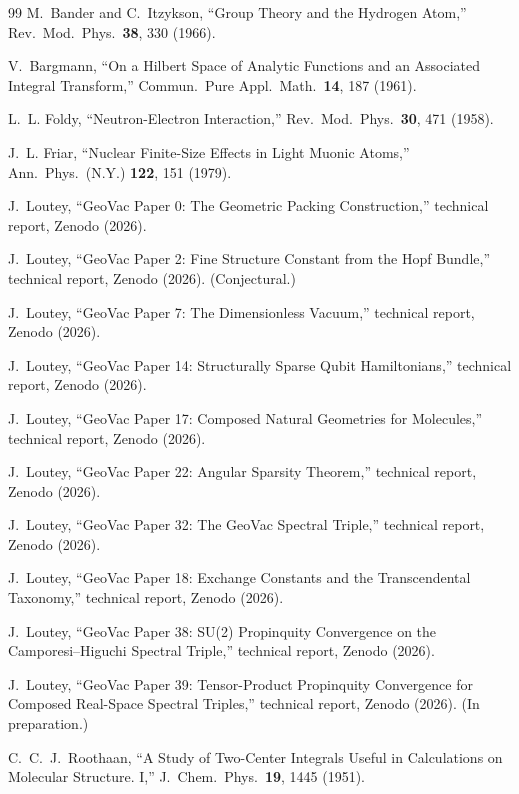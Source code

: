 \documentclass[twocolumn,prc,amsmath,amssymb,superscriptaddress]{revtex4-2}
\begin{document}
\begin{thebibliography}{99}
M.~Bander and C.~Itzykson,
``Group Theory and the Hydrogen Atom,''
Rev.~Mod.~Phys.~\textbf{38}, 330 (1966).

V.~Bargmann,
``On a Hilbert Space of Analytic Functions and an Associated Integral
Transform,''
Commun.~Pure Appl.~Math.~\textbf{14}, 187 (1961).

L.~L. Foldy,
``Neutron-Electron Interaction,''
Rev.~Mod.~Phys.~\textbf{30}, 471 (1958).

J.~L. Friar,
``Nuclear Finite-Size Effects in Light Muonic Atoms,''
Ann.~Phys.~(N.Y.) \textbf{122}, 151 (1979).

J.~Loutey, ``GeoVac Paper 0: The Geometric Packing Construction,''
technical report, Zenodo (2026).

J.~Loutey, ``GeoVac Paper 2: Fine Structure Constant from the Hopf
Bundle,'' technical report, Zenodo (2026). (Conjectural.)

J.~Loutey, ``GeoVac Paper 7: The Dimensionless Vacuum,''
technical report, Zenodo (2026).

J.~Loutey, ``GeoVac Paper 14: Structurally Sparse Qubit Hamiltonians,''
technical report, Zenodo (2026).

J.~Loutey, ``GeoVac Paper 17: Composed Natural Geometries for
Molecules,'' technical report, Zenodo (2026).

J.~Loutey, ``GeoVac Paper 22: Angular Sparsity Theorem,''
technical report, Zenodo (2026).

J.~Loutey, ``GeoVac Paper 32: The GeoVac Spectral Triple,''
technical report, Zenodo (2026).

J.~Loutey, ``GeoVac Paper 18: Exchange Constants and the Transcendental
Taxonomy,'' technical report, Zenodo (2026).

J.~Loutey, ``GeoVac Paper 38: SU(2) Propinquity Convergence on the
Camporesi--Higuchi Spectral Triple,'' technical report, Zenodo (2026).

J.~Loutey, ``GeoVac Paper 39: Tensor-Product Propinquity Convergence
for Composed Real-Space Spectral Triples,'' technical report, Zenodo
(2026). (In preparation.)

C.~C.~J.~Roothaan,
``A Study of Two-Center Integrals Useful in Calculations on Molecular
Structure. I,''
J.~Chem.~Phys.~\textbf{19}, 1445 (1951).


\end{thebibliography}
\end{document}
